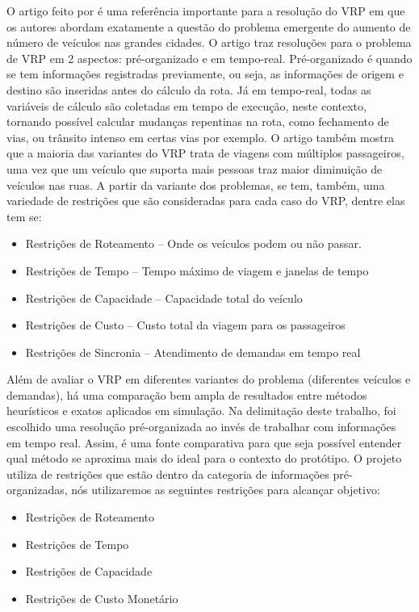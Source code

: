 O artigo feito por \cite{MOURAD2019323} é uma referência importante para a resolução do VRP em que os autores abordam exatamente a questão do problema emergente do aumento de número de veículos nas grandes cidades. O artigo traz resoluções para o problema de VRP em 2 aspectos: pré-organizado e em tempo-real. Pré-organizado é quando se tem informações  registradas previamente, ou seja, as informações de origem e destino são inseridas antes do cálculo da rota. Já em tempo-real, todas as variáveis de cálculo são coletadas em tempo de execução, neste contexto, tornando possível calcular mudanças repentinas na rota, como fechamento de vias, ou trânsito intenso em certas vias por exemplo. O artigo também mostra que a maioria das variantes do VRP trata de viagens com múltiplos passageiros, uma vez que um veículo que suporta mais pessoas traz maior diminuição de veículos nas ruas.
A partir da variante dos problemas, se tem, também, uma variedade de restrições que são consideradas para cada caso do VRP, dentre elas tem se:

\begin{itemize}
\item Restrições de Roteamento -- Onde os veículos podem ou não passar.
\item Restrições de Tempo -- Tempo máximo de viagem e janelas de tempo
\item Restrições de Capacidade -- Capacidade total do veículo
\item Restrições de Custo -- Custo total da viagem para os passageiros
\item Restrições de Sincronia -- Atendimento de demandas em tempo real
\end{itemize}

 Além de avaliar o VRP em diferentes variantes do problema (diferentes veículos e demandas), há uma comparação bem ampla de resultados entre métodos heurísticos e exatos aplicados em simulação. Na delimitação deste trabalho, foi escolhido uma resolução pré-organizada ao invés de trabalhar com informações em tempo real. Assim, é uma fonte comparativa para que seja possível entender qual método se aproxima mais do ideal para o contexto do protótipo. O projeto utiliza de restrições que estão dentro da categoria de informações pré-organizadas, nós utilizaremos as seguintes restrições para alcançar objetivo:

\begin{itemize}
\item Restrições de Roteamento
\item Restrições de Tempo
\item Restrições de Capacidade
\item Restrições de Custo Monetário
\end{itemize}

